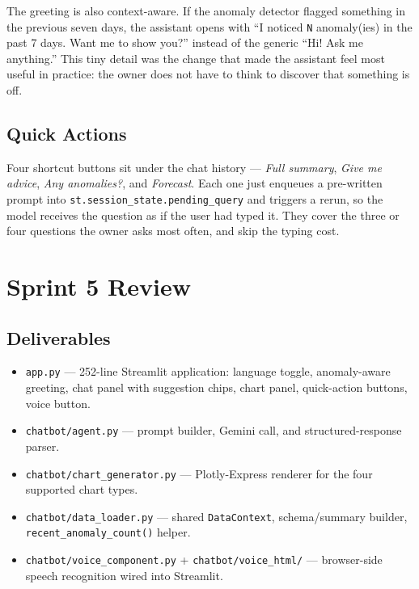 \documentclass[12pt, a4paper]{report}
\begin{document}
The greeting is also context-aware. If the anomaly detector flagged
something in the previous seven days, the assistant opens with
``I noticed \texttt{N} anomaly(ies) in the past 7 days. Want me to show
you?'' instead of the generic ``Hi! Ask me anything.'' This tiny detail
was the change that made the assistant feel most useful in practice:
the owner does not have to think to discover that something is off.

\subsection{Quick Actions}

Four shortcut buttons sit under the chat history --- \textit{Full
summary}, \textit{Give me advice}, \textit{Any anomalies?}, and
\textit{Forecast}. Each one just enqueues a pre-written prompt into
\texttt{st.session\_state.pending\_query} and triggers a rerun, so the
model receives the question as if the user had typed it. They cover the
three or four questions the owner asks most often, and skip the typing
cost.

\section{Sprint 5 Review}

\subsection{Deliverables}

\begin{itemize}[noitemsep]
  \item \texttt{app.py} --- 252-line Streamlit application: language
        toggle, anomaly-aware greeting, chat panel with suggestion
        chips, chart panel, quick-action buttons, voice button.
  \item \texttt{chatbot/agent.py} --- prompt builder, Gemini call, and
        structured-response parser.
  \item \texttt{chatbot/chart\_generator.py} --- Plotly-Express
        renderer for the four supported chart types.
  \item \texttt{chatbot/data\_loader.py} --- shared
        \texttt{DataContext}, schema/summary builder,
        \texttt{recent\_anomaly\_count()} helper.
  \item \texttt{chatbot/voice\_component.py} +
        \texttt{chatbot/voice\_html/} --- browser-side speech
        recognition wired into Streamlit.
\end{itemize}
\end{document}
